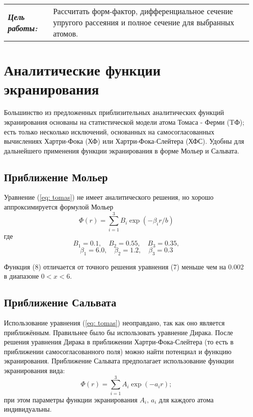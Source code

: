 \documentclass[a4paper,14pt]{extarticle} %
\renewcommand{\tabularxcolumn}[1]{m{#1}}
\begin{document}
\renewcommand{\tabularxcolumn}[1]{p{#1}}
\begin{center}
\begin{tabularx}{\linewidth}{T{0.5}|T{1.5}}
	\textit{\textbf{Цель работы:}}
	& Рассчитать форм-фактор, дифференциальное сечение упругого рассеяния и полное сечение для выбранных атомов.
\end{tabularx}
\end{center}

\section{Аналитические функции экранирования}

Большинство из предложенных приблизительных аналитических функций 
экранирования основаны на статистической модели атома Томаса - Ферми 
(TФ); есть только несколько исключений, основанных на самосогласованных 
вычислениях Хартри-Фока (ХФ) или Хартри-Фока-Слейтера (ХФС). Удобны для дальнейшего применения функции экранирования в форме Мольер и Сальвата.

\subsection{Приближение Мольер}

Уравнение (\ref{eq: tomas}) не имеет аналитического 
решения, но хорошо аппроксимируется формулой Мольер
\begin{equation}
\Phi(r)=\sum_{i=1}^3B_i\exp(-\beta_ir/b)
\label{eq:a8}
\end{equation}
где
$$B_1=0.1,\quad B_2=0.55,\quad B_3=0.35, $$
$$\beta_1=6.0,\quad \beta_2=1.2,\quad \beta_3=0.3$$
 
Функция (8) отличается от точного решения уравнения (7) меньше чем на 
0.002 в диапазоне $0<x<6$.

\subsection{Приближение Сальвата}

Использование уравнения (\ref{eq: tomas}) неоправдано, так как оно является приближённым. Правильнее было бы использовать уравнение Дирака. После решения уравнения Дирака в приближении Хартри-Фока-Слейтера (то есть в приближении самосогласованного поля) можно найти потенциал и функцию экранирования. Приближение Сальвата предполагает использование функции экранирования вида:
\begin{equation}
{\Phi}(r) = \sum\limits_{i = 1}^3 {{A_i}\exp ( - {a_i}r)};
\label{eq:Salvat11}
\end{equation}
при этом параметры функции экранирования $A_i,\, a_i$ для каждого атома индивидуальны. 
\end{document}
